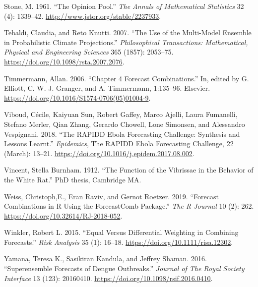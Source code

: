 \documentclass[
]{article}
\newlength{\cslhangindent}
\newenvironment{CSLReferences}[2] %
 {\begin{list}{}{%
  \setlength{\itemindent}{0pt}
  \setlength{\leftmargin}{0pt}
  \setlength{\parsep}{0pt}
  \ifodd #1
   \setlength{\leftmargin}{\cslhangindent}
   \setlength{\itemindent}{-1\cslhangindent}
  \fi
  \setlength{\itemsep}{#2\baselineskip}}}
 {\end{list}}
\begin{document}
\begin{CSLReferences}{1}{0}
Stone, M. 1961. {``The Opinion Pool.''} \emph{The Annals of Mathematical
Statistics} 32 (4): 1339--42. \url{http://www.jstor.org/stable/2237933}.

Tebaldi, Claudia, and Reto Knutti. 2007. {``The Use of the Multi-Model
Ensemble in Probabilistic Climate Projections.''} \emph{Philosophical
Transactions: Mathematical, Physical and Engineering Sciences} 365
(1857): 2053--75. \url{https://doi.org/10.1098/rsta.2007.2076}.

Timmermann, Allan. 2006. {``Chapter 4 Forecast Combinations.''} In,
edited by G. Elliott, C. W. J. Granger, and A. Timmermann, 1:135--96.
Elsevier. \url{https://doi.org/10.1016/S1574-0706(05)01004-9}.

Viboud, Cécile, Kaiyuan Sun, Robert Gaffey, Marco Ajelli, Laura
Fumanelli, Stefano Merler, Qian Zhang, Gerardo Chowell, Lone Simonsen,
and Alessandro Vespignani. 2018. {``The RAPIDD Ebola Forecasting
Challenge: Synthesis and Lessons Learnt.''} \emph{Epidemics}, The RAPIDD
Ebola Forecasting Challenge, 22 (March): 13--21.
\url{https://doi.org/10.1016/j.epidem.2017.08.002}.

Vincent, Stella Burnham. 1912. {``The Function of the Vibrissae in the
Behavior of the White Rat.''} PhD thesis, Cambridge MA.

Weiss, Christoph,E., Eran Raviv, and Gernot Roetzer. 2019. {``Forecast
Combinations in R Using the ForecastComb Package.''} \emph{The R
Journal} 10 (2): 262. \url{https://doi.org/10.32614/RJ-2018-052}.

Winkler, Robert L. 2015. {``Equal Versus Differential Weighting in
Combining Forecasts.''} \emph{Risk Analysis} 35 (1): 16--18.
\url{https://doi.org/10.1111/risa.12302}.

Yamana, Teresa K., Sasikiran Kandula, and Jeffrey Shaman. 2016.
{``Superensemble Forecasts of Dengue Outbreaks.''} \emph{Journal of The
Royal Society Interface} 13 (123): 20160410.
\url{https://doi.org/10.1098/rsif.2016.0410}.

\end{CSLReferences}
\end{document}
